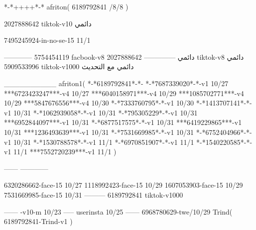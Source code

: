 *-*++++*-*
afriton(
6189792841 /8/8
)

2027888642 tiktok-v10
دائمي


7495245924-in-no-se-15 11/1

------------
5754454119 facbook-v8
دائمي
--------------
2027888642 tiktok-v8
دائمي
5909533996 tiktok-v1000
دائمي مع التحديث

__________
afriton1(
*-*6189792841*-*-
*-*7687339020*-*-v1 10/27
***6723423247***-v4 10/27
***6040158971***-v4 10/29
***1085702771***-v4 10/29
***5847676556***-v4 10/30
*-*7333760795*-*-v1 10/30
*-*1413707141*-*-v1 10/31
*-*1062939058*-*-v1 10/31
*-*795305229*-*-v1 10/31
***6952844097***-v1 10/31
*-*6877517575*-*-v1 10/31
***6419229865***-v1 10/31
***1236493639***-v1 10/31
*-*7531669985*-*-v1 10/31
*-*6752404966*-*-v1 10/31
*-*1530788578*-*-v1 11/1
*-*6970851907*-*-v1 11/1
*-*1540220585*-*-v1 11/1
***7552720239***-v1 11/1
)

------
------------


6320286662-face-15 10/27
1118992423-face-15 10/29
1607053903-face-15 10/29
7531669985-face-15 10/31
---------
6189792841 tiktok-v1000

------
-v10-m 10/23
-----
userinsta 10/25
------
6968780629-twe/10/29
Trind(
6189792841-Trind-v1 
)

